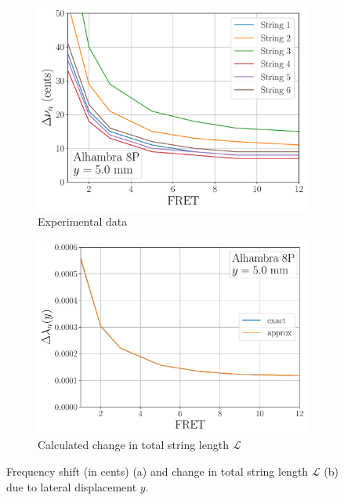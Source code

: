  \begin{figure}
  \centering
  \begin{subfigure}[b]{0.8\textwidth}
   \centering
   \includegraphics[width=5.0in]{figures/shift_data}
   \caption{Experimental data}
   \label{fig:shift_data}
  \end{subfigure}
  \par\vspace{0.25in}
  \begin{subfigure}[b]{0.8\textwidth}
   \centering
   \includegraphics[width=5.0in]{figures/delta_lambda}
   \caption{Calculated change in total string length $\mathcal{L}$}
   \label{fig:delta_l}
  \end{subfigure}
  \caption{\label{fig:exp_data} Frequency shift (in cents) (a) and change in total string length $\mathcal{L}$ (b) due to lateral displacement $y$.}
 \end{figure}
